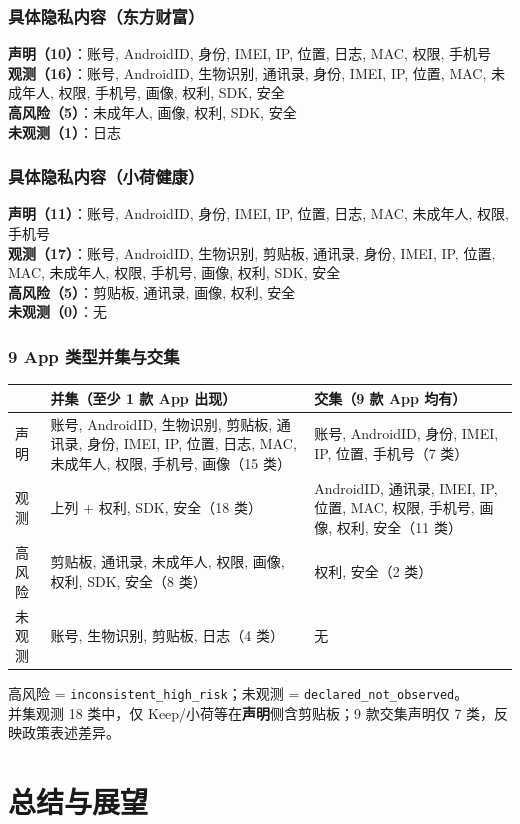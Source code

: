 \documentclass[AutoFakeBold,AutoFakeSlant]{beamer}
\newcommand{\apppiidetail}[4]{%
    \scriptsize
    \textbf{声明（#1）}：#2\\[0.15em]
    \textbf{观测（#3）}：#4\\[0.15em]
}
\begin{document}
\begin{frame}
    \frametitle{具体隐私内容（东方财富）}
    \apppiidetail{10}{账号, AndroidID, 身份, IMEI, IP, 位置, 日志, MAC, 权限, 手机号}{16}{账号, AndroidID, 生物识别, 通讯录, 身份, IMEI, IP, 位置, MAC, 未成年人, 权限, 手机号, 画像, 权利, SDK, 安全}
    \textbf{高风险（5）}：未成年人, 画像, 权利, SDK, 安全\\
    \textbf{未观测（1）}：日志
\end{frame}

\begin{frame}
    \frametitle{具体隐私内容（小荷健康）}
    \apppiidetail{11}{账号, AndroidID, 身份, IMEI, IP, 位置, 日志, MAC, 未成年人, 权限, 手机号}{17}{账号, AndroidID, 生物识别, 剪贴板, 通讯录, 身份, IMEI, IP, 位置, MAC, 未成年人, 权限, 手机号, 画像, 权利, SDK, 安全}
    \textbf{高风险（5）}：剪贴板, 通讯录, 画像, 权利, 安全\\
    \textbf{未观测（0）}：无
\end{frame}

\begin{frame}
    \frametitle{9 App 类型并集与交集}
    \tiny
    \begin{tabularx}{\textwidth}{|l|X|X|}
        \hline
        & \textbf{并集（至少 1 款 App 出现）} & \textbf{交集（9 款 App 均有）} \\
        \hline
        声明 & 账号, AndroidID, 生物识别, 剪贴板, 通讯录, 身份, IMEI, IP, 位置, 日志, MAC, 未成年人, 权限, 手机号, 画像（15 类） & 账号, AndroidID, 身份, IMEI, IP, 位置, 手机号（7 类） \\
        \hline
        观测 & 上列 + 权利, SDK, 安全（18 类） & AndroidID, 通讯录, IMEI, IP, 位置, MAC, 权限, 手机号, 画像, 权利, 安全（11 类） \\
        \hline
        高风险 & 剪贴板, 通讯录, 未成年人, 权限, 画像, 权利, SDK, 安全（8 类） & 权利, 安全（2 类） \\
        \hline
        未观测 & 账号, 生物识别, 剪贴板, 日志（4 类） & 无 \\
        \hline
    \end{tabularx}
    \vspace{0.3em}
    \scriptsize
    高风险 = \texttt{inconsistent\_high\_risk}；未观测 = \texttt{declared\_not\_observed}。\\
    并集观测 18 类中，仅 Keep/小荷等在\textbf{声明}侧含剪贴板；9 款交集声明仅 7 类，反映政策表述差异。
\end{frame}

\section{总结与展望}
\end{document}
